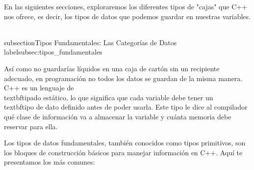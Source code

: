 En las siguientes secciones, exploraremos los diferentes tipos de "cajas" que C++ nos ofrece, es decir, los tipos de datos que podemos guardar en nuestras variables.

\\subsection{Tipos Fundamentales: Las Categorías de Datos}
\\label{subsec:tipos_fundamentales}

Así como no guardarías líquidos en una caja de cartón sin un recipiente adecuado, en programación no todos los datos se guardan de la misma manera. C++ es un lenguaje de \\textbf{tipado estático}, lo que significa que cada variable debe tener un \\textbf{tipo de dato} definido antes de poder usarla. Este tipo le dice al compilador qué clase de información va a almacenar la variable y cuánta memoria debe reservar para ella.

Los tipos de datos fundamentales, también conocidos como tipos primitivos, son los bloques de construcción básicos para manejar información en C++. Aquí te presentamos los más comunes:

